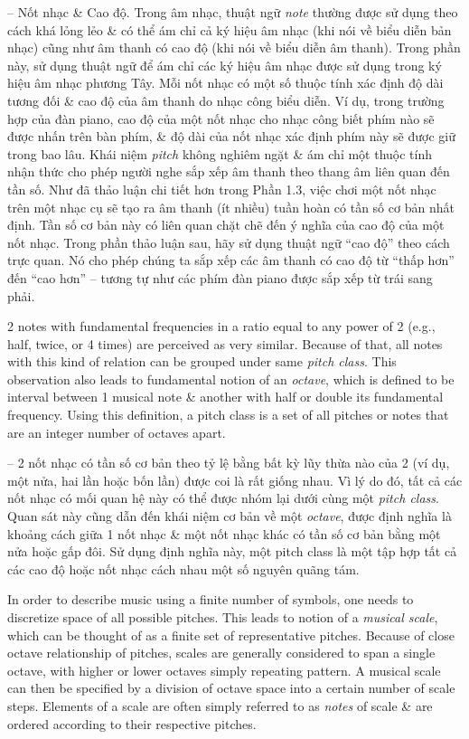 \documentclass{article}
\begin{document}
\begin{itemize}
\begin{itemize}
\begin{itemize}
			-- {\sf Nốt nhạc \& Cao độ.} Trong âm nhạc, thuật ngữ {\it note} thường được sử dụng theo cách khá lỏng lẻo \& có thể ám chỉ cả ký hiệu âm nhạc (khi nói về biểu diễn bản nhạc) cũng như âm thanh có cao độ (khi nói về biểu diễn âm thanh). Trong phần này, sử dụng thuật ngữ để ám chỉ các ký hiệu âm nhạc được sử dụng trong ký hiệu âm nhạc phương Tây. Mỗi nốt nhạc có một số thuộc tính xác định độ dài tương đối \& cao độ của âm thanh do nhạc công biểu diễn. Ví dụ, trong trường hợp của đàn piano, cao độ của một nốt nhạc cho nhạc công biết phím nào sẽ được nhấn trên bàn phím, \& độ dài của nốt nhạc xác định phím này sẽ được giữ trong bao lâu. Khái niệm {\it pitch} không nghiêm ngặt \& ám chỉ một thuộc tính nhận thức cho phép người nghe sắp xếp âm thanh theo thang âm liên quan đến tần số. Như đã thảo luận chi tiết hơn trong Phần 1.3, việc chơi một nốt nhạc trên một nhạc cụ sẽ tạo ra âm thanh (ít nhiều) tuần hoàn có tần số cơ bản nhất định. Tần số cơ bản này có liên quan chặt chẽ đến ý nghĩa của cao độ của một nốt nhạc. Trong phần thảo luận sau, hãy sử dụng thuật ngữ ``cao độ'' theo cách trực quan. Nó cho phép chúng ta sắp xếp các âm thanh có cao độ từ ``thấp hơn'' đến ``cao hơn'' -- tương tự như các phím đàn piano được sắp xếp từ trái sang phải.
			
			2 notes with fundamental frequencies in a ratio equal to any power of 2 (e.g., half, twice, or 4 times) are perceived as very similar. Because of that, all notes with this kind of relation can be grouped under same {\it pitch class}. This observation also leads to fundamental notion of an {\it octave}, which is defined to be interval between 1 musical note \& another with half or double its fundamental frequency. Using this definition, a pitch class is a set of all pitches or notes that are an integer number of octaves apart.
			
			-- 2 nốt nhạc có tần số cơ bản theo tỷ lệ bằng bất kỳ lũy thừa nào của 2 (ví dụ, một nửa, hai lần hoặc bốn lần) được coi là rất giống nhau. Vì lý do đó, tất cả các nốt nhạc có mối quan hệ này có thể được nhóm lại dưới cùng một {\it pitch class}. Quan sát này cũng dẫn đến khái niệm cơ bản về một {\it octave}, được định nghĩa là khoảng cách giữa 1 nốt nhạc \& một nốt nhạc khác có tần số cơ bản bằng một nửa hoặc gấp đôi. Sử dụng định nghĩa này, một pitch class là một tập hợp tất cả các cao độ hoặc nốt nhạc cách nhau một số nguyên quãng tám.
			
			In order to describe music using a finite number of symbols, one needs to discretize space of all possible pitches. This leads to notion of a {\it musical scale}, which can be thought of as a finite set of representative pitches. Because of close octave relationship of pitches, scales are generally considered to span a single octave, with higher or lower octaves simply repeating pattern. A musical scale can then be specified by a division of octave space into a certain number of scale steps. Elements of a scale are often simply referred to as {\it notes} of scale \& are ordered according to their respective pitches.
			

\end{itemize}
\end{itemize}
\end{itemize}
\end{document}
